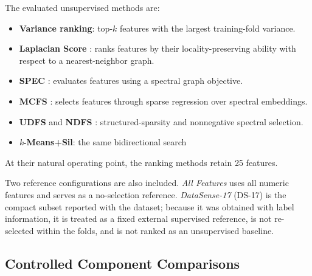 The evaluated unsupervised methods are:
\begin{itemize}
\item \textbf{Variance ranking}: top-$k$ features with the largest training-fold variance. 
\item \textbf{Laplacian Score} \cite{he2005laplacian}: ranks features by their locality-preserving ability with respect to a nearest-neighbor graph.
\item \textbf{SPEC} \cite{zhao2007spectral}: evaluates features using a spectral graph objective.
\item \textbf{MCFS} \cite{cai2010unsupervised}: selects features through sparse regression over spectral embeddings.
\item \textbf{UDFS} \cite{yang2011l2} and \textbf{NDFS} \cite{li2012unsupervised}: structured-sparsity and nonnegative spectral selection.
\item \textit{k}\textbf{-Means+Sil}: the same  bidirectional search
\end{itemize}
 At their natural operating point, the ranking methods retain 25 features.

Two reference configurations are also included. \emph{All Features} uses all numeric features and serves as a no-selection reference. \emph{DataSense-17} (DS-17) \cite{firouzi2025datasense} is the compact subset reported with the dataset; because it was obtained with label information, it is treated as a fixed external supervised reference, is not re-selected within the folds, and is not ranked as an unsupervised baseline.

\subsection{Controlled Component Comparisons}
\label{sec:ablation_setup}

